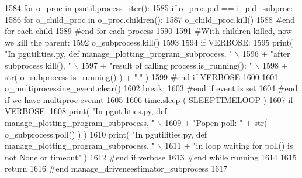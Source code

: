 \begin{DoxyCode}
1584                 \textcolor{keywordflow}{for} o\_proc \textcolor{keywordflow}{in} psutil.process\_iter():
1585                     \textcolor{keywordflow}{if} o\_proc.pid == i\_pid\_subproc:
1586                         \textcolor{keywordflow}{for} o\_child\_proc \textcolor{keywordflow}{in} o\_proc.children():
1587                             o\_child\_proc.kill()
1588                         \textcolor{comment}{#end for each child}
1589                 \textcolor{comment}{#end for each process}
1590 
1591                 \textcolor{comment}{#With children killed, now we kill the parent:}
1592                 o\_subprocess.kill()
1593 
1594                 \textcolor{keywordflow}{if} VERBOSE:
1595                     print( \textcolor{stringliteral}{"In pgutilities.py, def manage\_plotting\_program\_subprocess, "} \(\backslash\)
1596                                 + \textcolor{stringliteral}{"after  subprocess kill(), "} \(\backslash\)
1597                                 + \textcolor{stringliteral}{"result of calling process.is\_running(): "} \(\backslash\)
1598                                 + str( o\_subprocess.is\_running() )  + \textcolor{stringliteral}{"."} )
1599                 \textcolor{comment}{#end if VERBOSE}
1600 
1601                 o\_multiprocessing\_event.clear()
1602                 \textcolor{keywordflow}{break};
1603             \textcolor{comment}{#end if event is set}
1604         \textcolor{comment}{#end if we have multiproc evennt}
1605 
1606         time.sleep ( SLEEPTIMELOOP )
1607         \textcolor{keywordflow}{if} VERBOSE:
1608             print( \textcolor{stringliteral}{"In pgutilities.py, def manage\_plotting\_program\_subprocess, "} \(\backslash\)
1609                         + \textcolor{stringliteral}{"Popen poll: "} + str( o\_subprocess.poll() ) ) 
1610             print( \textcolor{stringliteral}{"In pgutilities.py, def manage\_plotting\_program\_subprocess, "} \(\backslash\)
1611                         + \textcolor{stringliteral}{"in loop waiting for poll() is not None or timeout"} )
1612         \textcolor{comment}{#end if verbose}
1613     \textcolor{comment}{#end while running}
1614 
1615     \textcolor{keywordflow}{return}
1616 \textcolor{comment}{#end manage\_driveneestimator\_subprocess}
1617 
\end{DoxyCode}
